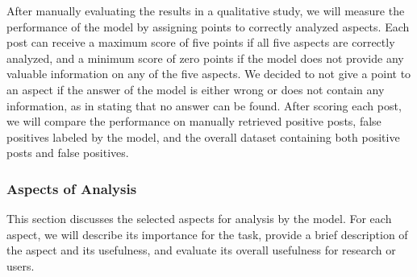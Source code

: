\documentclass[english,bachelor]{swsLeipzig}
\begin{document}
After manually evaluating the results in a qualitative study, we will measure the performance of the 
model by assigning points to correctly analyzed aspects. Each post can receive a maximum score of five points if all five aspects are correctly analyzed, and a minimum score of zero points if the model does not provide any valuable information on any of the five aspects. We decided to not give a point to an aspect if the answer of the model is either wrong or does not contain any information, as in stating that no answer can be found. After scoring each post, we will compare the performance on manually retrieved positive posts, false positives labeled by the model, and the overall dataset containing both positive posts and false positives.

\subsubsection{Aspects of Analysis}

This section discusses the selected aspects for analysis by the model. For each aspect, we will describe 
its importance for the task, provide a brief description of the aspect and its usefulness, and evaluate its overall usefulness for research or users.
\end{document}
